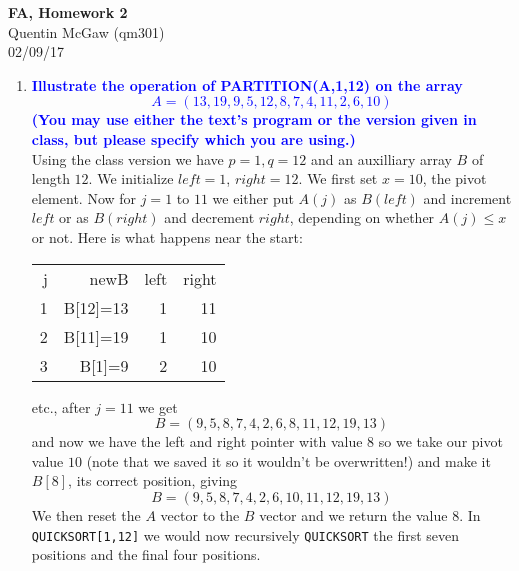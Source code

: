 \documentclass[11pt]{article}
\begin{document}
\begin{center} {\Large\bf FA, Homework 2}  \\ Quentin McGaw (qm301) \\ 02/09/17
\end{center}


\begin{enumerate}

\item  \textbf{\textcolor{blue}{Illustrate the operation of PARTITION(A,1,12) on the array 
\[ A=(13,19,9,5,12,8,7,4,11,2,6,10) \] 
(You may use either the text's program or the version given in class, but please specify which you are using.)}}
    \\ Using the class version we have $p=1,q=12$ and an auxilliary array $B$ of length $12$. 
    We initialize $left=1$, $right=12$.  We first set $x=10$, the pivot element. 
    Now for $j=1$ to $11$ we either put $A(j)$ as $B(left)$ and increment $left$ or as $B(right)$ and
    decrement $right$, depending on whether $A(j)\leq x$ or not.
    Here is what happens near the start:
    \begin{center}
    \begin{tabular}{rrrr} 
    j & newB & left & right \\
    1 & B[12]=13 & 1 & 11 \\
    2 & B[11]=19 & 1 & 10  \\
    3 & B[1]=9  & 2 & 10 
    \end{tabular}
    \end{center}
    etc.,  
    after $j=11$ we get
    \[ B=(9,5,8,7,4,2,6,8,11,12,19,13) \] 
    and now we have the left and right pointer with value $8$ so
    we take our pivot value $10$ (note that we saved it so it wouldn't
    be overwritten!) and make it $B[8]$, its correct position, giving
    \[ B=(9,5,8,7,4,2,6,10,11,12,19,13) \] 
    We then reset the $A$
    vector to the $B$ vector and we return
    the value $8$.  In {\tt QUICKSORT[1,12]} we would now recursively
    {\tt QUICKSORT} the first seven positions and the final four positions.


\end{enumerate}
\end{document}
